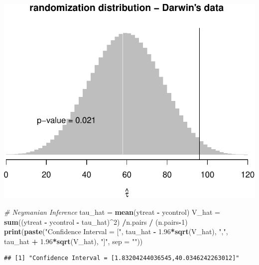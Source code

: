 \documentclass[]{article}
\newenvironment{Shaded}{\begin{snugshade}}{\end{snugshade}}
\newcommand{\KeywordTok}[1]{\textcolor[rgb]{0.13,0.29,0.53}{\textbf{#1}}}
\newcommand{\DataTypeTok}[1]{\textcolor[rgb]{0.13,0.29,0.53}{#1}}
\newcommand{\DecValTok}[1]{\textcolor[rgb]{0.00,0.00,0.81}{#1}}
\newcommand{\FloatTok}[1]{\textcolor[rgb]{0.00,0.00,0.81}{#1}}
\newcommand{\StringTok}[1]{\textcolor[rgb]{0.31,0.60,0.02}{#1}}
\newcommand{\CommentTok}[1]{\textcolor[rgb]{0.56,0.35,0.01}{\textit{#1}}}
\newcommand{\OperatorTok}[1]{\textcolor[rgb]{0.81,0.36,0.00}{\textbf{#1}}}
\newcommand{\NormalTok}[1]{#1}
\begin{document}
\includegraphics{hw3_files/figure-latex/unnamed-chunk-1-1.pdf}

\begin{Shaded}
\begin{Highlighting}[]
\CommentTok{# Neymanian Inference}
\NormalTok{tau_hat =}\StringTok{ }\KeywordTok{mean}\NormalTok{(ytreat }\OperatorTok{-}\StringTok{ }\NormalTok{ycontrol)}
\NormalTok{V_hat =}\StringTok{ }\KeywordTok{sum}\NormalTok{((ytreat }\OperatorTok{-}\StringTok{ }\NormalTok{ycontrol }\OperatorTok{-}\StringTok{ }\NormalTok{tau_hat)}\OperatorTok{^}\DecValTok{2}\NormalTok{) }\OperatorTok{/}\NormalTok{n.pairs }\OperatorTok{/}\StringTok{ }\NormalTok{(n.pairs}\OperatorTok{-}\DecValTok{1}\NormalTok{)}
\KeywordTok{print}\NormalTok{(}\KeywordTok{paste}\NormalTok{(}\StringTok{"Confidence Interval = ["}\NormalTok{, tau_hat }\OperatorTok{-}\StringTok{ }\FloatTok{1.96}\OperatorTok{*}\KeywordTok{sqrt}\NormalTok{(V_hat), }\StringTok{","}\NormalTok{, tau_hat }\OperatorTok{+}\StringTok{ }\FloatTok{1.96}\OperatorTok{*}\KeywordTok{sqrt}\NormalTok{(V_hat), }\StringTok{"]"}\NormalTok{, }\DataTypeTok{sep =} \StringTok{""}\NormalTok{))}
\end{Highlighting}
\end{Shaded}

\begin{verbatim}
## [1] "Confidence Interval = [1.83204244036545,40.0346242263012]"
\end{verbatim}
\end{document}
